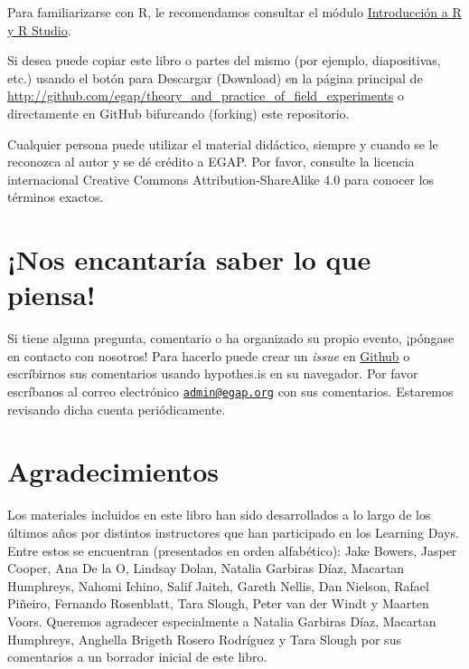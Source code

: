 \documentclass[
  12pt,
  spanish,
]{book}
\begin{document}
Para familiarizarse con R, le recomendamos consultar el módulo \href{introducción-a-r-y-rstudio.html}{Introducción a R y R Studio}.

Si desea puede copiar este libro o partes del mismo (por ejemplo, diapositivas, etc.) usando el botón para Descargar (Download) en la página principal de \url{http://github.com/egap/theory_and_practice_of_field_experiments} o directamente en GitHub bifurcando (forking) este repositorio.

Cualquier persona puede utilizar el material didáctico, siempre y cuando se le reconozca al autor y se dé crédito a EGAP. Por favor, consulte la licencia internacional Creative Commons Attribution-ShareAlike 4.0 para conocer los términos exactos.

\hypertarget{nos-encantaruxeda-saber-lo-que-piensa}{%
\section{¡Nos encantaría saber lo que piensa!}\label{nos-encantaruxeda-saber-lo-que-piensa}}

Si tiene alguna pregunta, comentario o ha organizado su propio evento, ¡póngase en contacto con nosotros! Para hacerlo puede crear un \emph{issue} en \href{https://github.com/egap/theory_and_practice_of_field_experiments/issues}{Github} o escríbirnos sus comentarios usando hypothes.is en su navegador. Por favor escríbanos al correo electrónico \href{mailto:admin@egap.org}{\nolinkurl{admin@egap.org}} con sus comentarios. Estaremos revisando dicha cuenta periódicamente.

\hypertarget{agradecimientos}{%
\section{Agradecimientos}\label{agradecimientos}}

Los materiales incluidos en este libro han sido desarrollados a lo largo de los últimos años por distintos instructores que han participado en los Learning Days. Entre estos se encuentran (presentados en orden alfabético): Jake Bowers, Jasper Cooper, Ana De la O, Lindsay Dolan, Natalia Garbiras Díaz, Macartan Humphreys, Nahomi Ichino, Salif Jaiteh, Gareth Nellis, Dan Nielson, Rafael Piñeiro, Fernando Rosenblatt, Tara Slough, Peter van der Windt y Maarten Voors. Queremos agradecer especialmente a Natalia Garbiras Díaz, Macartan Humphreys, Anghella Brigeth Rosero Rodríguez y Tara Slough por sus comentarios a un borrador inicial de este libro.
\end{document}
